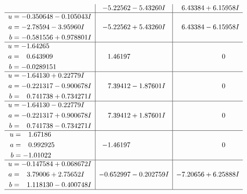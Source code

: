 \documentclass[1p]{elsarticle_modified}
\theoremstyle{definition}
\begin{document}
$$\begin{array}{c|c|c}
 & -5.22562 - 5.43260 I & \phantom{-}6.43384 + 6.15958 I \\ \hline\begin{aligned}
u &= -0.350648 - 0.105043 I \\
a &= -2.78594 - 3.95960 I \\
b &= -0.581556 + 0.978801 I\end{aligned}
 & -5.22562 + 5.43260 I & \phantom{-}6.43384 - 6.15958 I \\ \hline\begin{aligned}
u &= -1.64265\phantom{ +0.000000I} \\
a &= \phantom{-}0.643909\phantom{ +0.000000I} \\
b &= -0.0289151\phantom{ +0.000000I}\end{aligned}
 & \phantom{-}1.46197\phantom{ +0.000000I} & \phantom{-0.000000 } 0 \\ \hline\begin{aligned}
u &= -1.64130 + 0.22779 I \\
a &= -0.221317 - 0.900678 I \\
b &= \phantom{-}0.741738 + 0.734271 I\end{aligned}
 & \phantom{-}7.39412 - 1.87601 I & \phantom{-0.000000 } 0 \\ \hline\begin{aligned}
u &= -1.64130 - 0.22779 I \\
a &= -0.221317 + 0.900678 I \\
b &= \phantom{-}0.741738 - 0.734271 I\end{aligned}
 & \phantom{-}7.39412 + 1.87601 I & \phantom{-0.000000 } 0 \\ \hline\begin{aligned}
u &= \phantom{-}1.67186\phantom{ +0.000000I} \\
a &= \phantom{-}0.992925\phantom{ +0.000000I} \\
b &= -1.01022\phantom{ +0.000000I}\end{aligned}
 & -1.46197\phantom{ +0.000000I} & \phantom{-0.000000 } 0 \\ \hline\begin{aligned}
u &= -0.147584 + 0.068672 I \\
a &= \phantom{-}3.79006 + 2.75652 I \\
b &= \phantom{-}1.118130 - 0.400748 I\end{aligned}
 & -0.652997 - 0.202759 I & -7.20656 + 6.25888 I\\
 \hline 
 \end{array}$$\newpage$$\begin{array}{c|c|c}  

\end{array}$$
\end{document}
